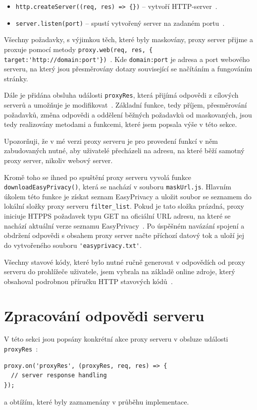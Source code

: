 \begin{itemize}
    \item \texttt{http.createServer((req, res) => \{\})} -- vytvoří HTTP-server~\cite{http}.
    \item \texttt{server.listen(port)} -- spustí vytvořený server na zadaném portu~\cite{http}.
\end{itemize}

Všechny požadavky, s výjimkou těch, které byly maskovány, proxy server přijme a proxuje pomocí metody \verb|proxy.web(req, res, { target:'http://domain:port'})|~\cite{http-proxy}. Kde \texttt{domain:port} je adresa a port webového serveru, na který jsou přesměrovány dotazy související se načítáním a fungováním stránky.

Dále je přidána obsluha události \texttt{proxyRes}, která přijímá odpovědi z cílových serverů a umožňuje je modifikovat~\cite{http-proxy}. Základní funkce, tedy příjem, přesměrování požadavků, změna odpovědi a oddělení běžných požadavků od maskovaných, jsou tedy realizovány metodami a funkcemi, které jsem popsala výše v této sekce. 

Upozorňuji, že v mé verzi proxy serveru je pro provedení funkcí v něm zabudovaných nutné, aby uživatelé přecházeli na adresu, na které běží samotný proxy server, nikoliv webový server. 

Kromě toho se ihned po spuštění proxy serveru vyvolá funkce \texttt{downloadEasyPrivacy()}, která se nachází v souboru \texttt{maskUrl.js}. Hlavním úkolem této funkce je získat seznam EasyPrivacy a uložit soubor se seznamem do lokální složky proxy serveru \texttt{filter\_list}. Pokud je tato složka prázdná, proxy iniciuje HTPPS požadavek typu GET na oficiální URL adresu, na které se nachází aktuální verze seznamu EasyPrivacy~\cite{easyPrivacy}. Po úspěšném navázání spojení a obdržení odpovědi s obsahem proxy server načte příchozí datový tok a uloží jej do vytvořeného souboru \verb|'easyprivacy.txt'|.

Všechny stavové kódy, které bylo nutné ručně generovat v odpovědích od proxy serveru do prohlížeče uživatele, jsem vybrala na základě online zdroje, který obsahoval podrobnou příručku HTTP stavových kódů~\cite{statusCode}. 

\section{Zpracování odpovědi serveru}

V této sekci jsou popsány konkrétní akce proxy serveru v obsluze události \texttt{proxyRes}~\cite{http-proxy}:
\begin{lstlisting}[caption=Event 'proxyRes']
proxy.on('proxyRes', (proxyRes, req, res) => {
  // server response handling
});
\end{lstlisting}
a obtížím, které byly zaznamenány v průběhu implementace.

